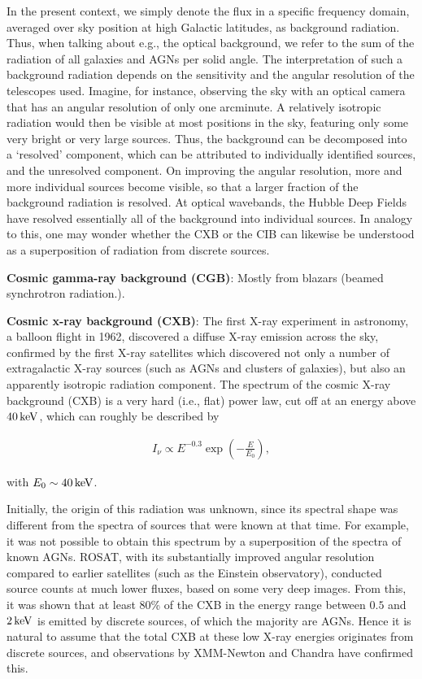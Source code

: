 \documentclass[a4paper,11pt]{article}
\begin{document}
{\noindent}In the present context, we simply denote the flux in a specific frequency domain, averaged over sky position at high Galactic latitudes, as background radiation. Thus, when talking about e.g., the optical background, we refer to the sum of the radiation of all galaxies and AGNs per solid angle. The interpretation of such a background radiation depends on the sensitivity and the angular resolution of the telescopes used. Imagine, for instance, observing the sky with an optical camera that has an angular resolution of only one arcminute. A relatively isotropic radiation would then be visible at most positions in the sky, featuring only some very bright or very large sources. Thus, the background can be decomposed into a `resolved' component, which can be attributed to individually identified sources, and the unresolved component. On improving the angular resolution, more and more individual sources become visible, so that a larger fraction of the background radiation is resolved. At optical wavebands, the Hubble Deep Fields have resolved essentially all of the background into individual sources. In analogy to this, one may wonder whether the CXB or the CIB can likewise be understood as a superposition of radiation from discrete sources.

{\noindent}\textbf{Cosmic gamma-ray background (CGB)}: Mostly from blazars (beamed synchrotron radiation.).

{\noindent}\textbf{Cosmic x-ray background (CXB)}: The first X-ray experiment in astronomy, a balloon flight in 1962, discovered a diffuse X-ray emission across the sky, confirmed by the first X-ray satellites which discovered not only a number of extragalactic X-ray sources (such as AGNs and clusters of galaxies), but also an apparently isotropic radiation component. The spectrum of the cosmic X-ray background (CXB) is a very hard (i.e., flat) power law, cut off at an energy above $40\,{\rm keV}$, which can roughly be described by

\begin{align*}
    I_\nu \propto E^{-0.3}\exp\left(-\frac{E}{E_0}\right),
\end{align*}

{\noindent}with $E_0\sim40\,{\rm keV}$. 

{\noindent}Initially, the origin of this radiation was unknown, since its spectral shape was different from the spectra of sources that were known at that time. For example, it was not possible to obtain this spectrum by a superposition of the spectra of known AGNs. ROSAT, with its substantially improved angular resolution compared to earlier satellites (such as the Einstein observatory), conducted source counts at much lower fluxes, based on some very deep images. From this, it was shown that at least 80\% of the CXB in the energy range between $0.5$ and $2\,{\rm keV}$ is emitted by discrete sources, of which the majority are AGNs. Hence it is natural to assume that the total CXB at these low X-ray energies originates from discrete sources, and observations by XMM-Newton and Chandra have confirmed this.
\end{document}
